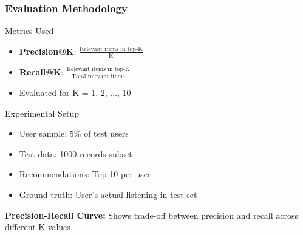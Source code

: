 \documentclass[11pt]{beamer}
\begin{document}
\begin{frame}
\frametitle{Evaluation Methodology}
\begin{block}{Metrics Used}
\begin{itemize}
\item \textbf{Precision@K}: $\frac{\text{Relevant items in top-K}}{\text{K}}$
\item \textbf{Recall@K}: $\frac{\text{Relevant items in top-K}}{\text{Total relevant items}}$
\item Evaluated for K = 1, 2, ..., 10
\end{itemize}
\end{block}

\begin{block}{Experimental Setup}
\begin{itemize}
\item User sample: 5\% of test users
\item Test data: 1000 records subset
\item Recommendations: Top-10 per user
\item Ground truth: User's actual listening in test set
\end{itemize}
\end{block}

\textbf{Precision-Recall Curve:} Shows trade-off between precision and recall across different K values
\end{frame}
\end{document}
